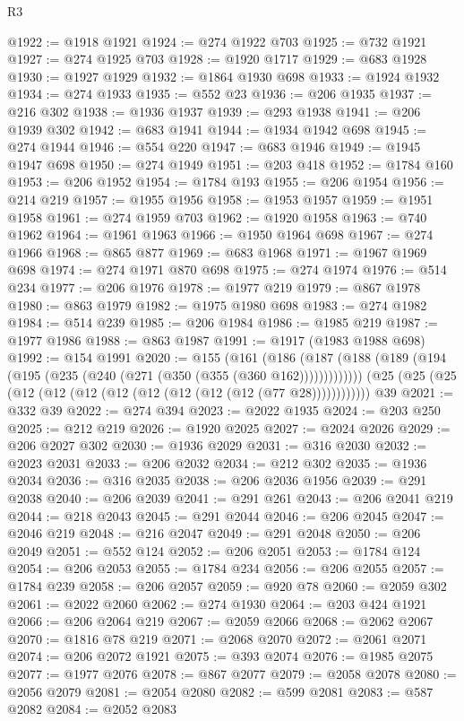 \begin{lexlean}{R3}
\begin{coremodule}
@1922 := @1918 @1921
@1924 := @274 @1922 @703
@1925 := @732 @1921
@1927 := @274 @1925 @703
@1928 := @1920 @1717
@1929 := @683 @1928
@1930 := @1927 @1929
@1932 := @1864 @1930 @698
@1933 := @1924 @1932
@1934 := @274 @1933
@1935 := @552 @23
@1936 := @206 @1935
@1937 := @216 @302
@1938 := @1936 @1937
@1939 := @293 @1938
@1941 := @206 @1939 @302
@1942 := @683 @1941
@1944 := @1934 @1942 @698
@1945 := @274 @1944
@1946 := @554 @220
@1947 := @683 @1946
@1949 := @1945 @1947 @698
@1950 := @274 @1949
@1951 := @203 @418
@1952 := @1784 @160
@1953 := @206 @1952
@1954 := @1784 @193
@1955 := @206 @1954
@1956 := @214 @219
@1957 := @1955 @1956
@1958 := @1953 @1957
@1959 := @1951 @1958
@1961 := @274 @1959 @703
@1962 := @1920 @1958
@1963 := @740 @1962
@1964 := @1961 @1963
@1966 := @1950 @1964 @698
@1967 := @274 @1966
@1968 := @865 @877
@1969 := @683 @1968
@1971 := @1967 @1969 @698
@1974 := @274 @1971 @870 @698
@1975 := @274 @1974
@1976 := @514 @234
@1977 := @206 @1976
@1978 := @1977 @219
@1979 := @867 @1978
@1980 := @863 @1979
@1982 := @1975 @1980 @698
@1983 := @274 @1982
@1984 := @514 @239
@1985 := @206 @1984
@1986 := @1985 @219
@1987 := @1977 @1986
@1988 := @863 @1987
@1991 := @1917 (@1983 @1988 @698)
@1992 := @154 @1991
@2020 := @155
    (@161 (@186 (@187 (@188 (@189 (@194 (@195 (@235 (@240 (@271 (@350 (@355 (@360 @162)))))))))))))
    (@25 (@25 (@25 (@12 (@12 (@12 (@12 (@12 (@12 (@12 (@12 (@77 @28))))))))))))
    @39
@2021 := @332 @39
@2022 := @274 @394
@2023 := @2022 @1935
@2024 := @203 @250
@2025 := @212 @219
@2026 := @1920 @2025
@2027 := @2024 @2026
@2029 := @206 @2027 @302
@2030 := @1936 @2029
@2031 := @316 @2030
@2032 := @2023 @2031
@2033 := @206 @2032
@2034 := @212 @302
@2035 := @1936 @2034
@2036 := @316 @2035
@2038 := @206 @2036 @1956
@2039 := @291 @2038
@2040 := @206 @2039
@2041 := @291 @261
@2043 := @206 @2041 @219
@2044 := @218 @2043
@2045 := @291 @2044
@2046 := @206 @2045
@2047 := @2046 @219
@2048 := @216 @2047
@2049 := @291 @2048
@2050 := @206 @2049
@2051 := @552 @124
@2052 := @206 @2051
@2053 := @1784 @124
@2054 := @206 @2053
@2055 := @1784 @234
@2056 := @206 @2055
@2057 := @1784 @239
@2058 := @206 @2057
@2059 := @920 @78
@2060 := @2059 @302
@2061 := @2022 @2060
@2062 := @274 @1930
@2064 := @203 @424 @1921
@2066 := @206 @2064 @219
@2067 := @2059 @2066
@2068 := @2062 @2067
@2070 := @1816 @78 @219
@2071 := @2068 @2070
@2072 := @2061 @2071
@2074 := @206 @2072 @1921
@2075 := @393 @2074
@2076 := @1985 @2075
@2077 := @1977 @2076
@2078 := @867 @2077
@2079 := @2058 @2078
@2080 := @2056 @2079
@2081 := @2054 @2080
@2082 := @599 @2081
@2083 := @587 @2082
@2084 := @2052 @2083

\end{coremodule}
\end{lexlean}
